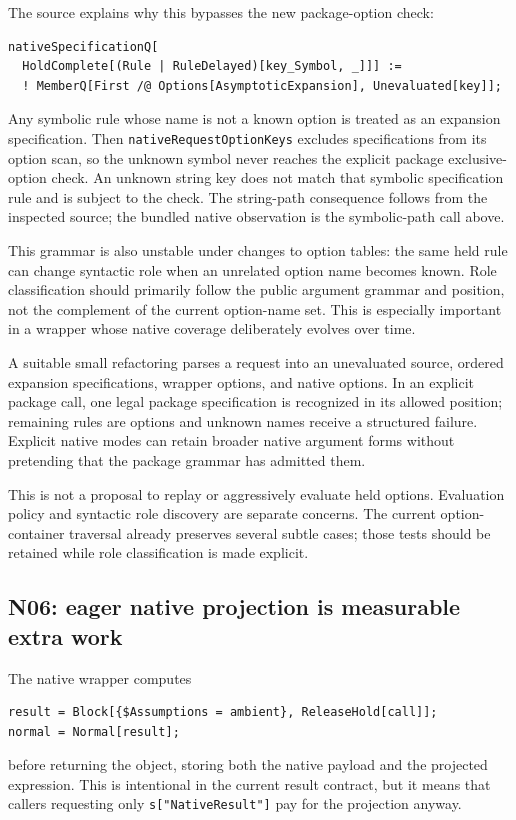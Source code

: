 \documentclass[11pt,letterpaper]{article}
\newcommand{\code}[1]{\nolinkurl{#1}}
\begin{document}
The source explains why this bypasses the new package-option check:
\begin{lstlisting}
nativeSpecificationQ[
  HoldComplete[(Rule | RuleDelayed)[key_Symbol, _]]] :=
  ! MemberQ[First /@ Options[AsymptoticExpansion], Unevaluated[key]];
\end{lstlisting}
Any symbolic rule whose name is not a known option is treated as an expansion
specification. Then \code{nativeRequestOptionKeys} excludes specifications from
its option scan, so the unknown symbol never reaches the explicit package
exclusive-option check. An unknown string key does not match that symbolic
specification rule and is subject to the check. The string-path consequence
follows from the inspected source; the bundled native observation is the
symbolic-path call above.~\cite{compatibility}

This grammar is also unstable under changes to option tables: the same held
rule can change syntactic role when an unrelated option name becomes known.
Role classification should primarily follow the public argument grammar and
position, not the complement of the current option-name set. This is especially
important in a wrapper whose native coverage deliberately evolves over time.

A suitable small refactoring parses a request into an unevaluated source,
ordered expansion specifications, wrapper options, and native options. In an
explicit package call, one legal package specification is recognized in its
allowed position; remaining rules are options and unknown names receive a
structured failure. Explicit native modes can retain broader native argument
forms without pretending that the package grammar has admitted them.

This is not a proposal to replay or aggressively evaluate held options.
Evaluation policy and syntactic role discovery are separate concerns. The
current option-container traversal already preserves several subtle cases;
those tests should be retained while role classification is made explicit.

\subsection{N06: eager native projection is measurable extra work}
The native wrapper computes
\begin{lstlisting}
result = Block[{$Assumptions = ambient}, ReleaseHold[call]];
normal = Normal[result];
\end{lstlisting}
before returning the object, storing both the native payload and the projected
expression. This is intentional in the current result contract, but it means
that callers requesting only \code{s["NativeResult"]} pay for the projection
anyway.~\cite{compatibility,nativecontracts}
\end{document}
